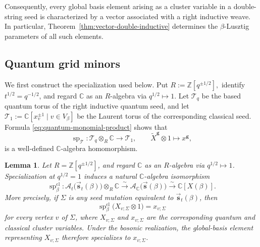 \documentclass[12pt, reqno]{amsart}
\theoremstyle{plain}
\newtheorem{lemma}[theorem]{Lemma}
\theoremstyle{definition}
\numberwithin{equation}{section}
\newcommand{\ZZ}{\mathbb{Z}}
\newcommand{\CC}{\mathbb{C}}
\begin{document}
Consequently, every global basis element arising as a cluster
variable in a double-string seed is characterized by a vector
associated with a right inductive weave. In particular,
Theorem~\ref{thm:vector-double-inductive} determines the
\(\beta\)-Lusztig parameters of all such elements.
\subsection{Quantum grid minors}
We first construct the specialization used below. Put
\(
    R:=\ZZ[q^{\pm1/2}],
\)
identify \(t^{1/2}=q^{-1/2}\), and regard \(\CC\) as an
\(R\)-algebra via \(q^{1/2}\mapsto1\). Let
\(\mathcal T_q\) be the based quantum torus of the right inductive
quantum seed, and let
\(
    \mathcal T_1
    :=
    \CC[x_v^{\pm1}\mid v\in V_\beta]
\)
be the Laurent torus of the corresponding classical seed. Formula
\eqref{eq:quantum-monomial-product} shows that
\begin{equation}\label{eq:initial-torus-specialization}
    \operatorname{sp}_{\mathcal T}\colon
    \mathcal T_q\otimes_R\CC
    \longrightarrow
    \mathcal T_1,
    \qquad
    \widetilde X^{\mathbf g}\otimes1
    \longmapsto
    x^{\mathbf g},
\end{equation}
is a well-defined \(\CC\)-algebra homomorphism.

\begin{lemma}
\label{lem:specialization-cluster-variables}
Let \(R=\ZZ[q^{\pm1/2}]\), and regard \(\CC\) as an \(R\)-algebra
via \(q^{1/2}\mapsto1\). Specialization at \(q^{1/2}=1\) induces a
natural \(\CC\)-algebra isomorphism
\begin{equation}\label{eq:cluster-specialization-map}
    \operatorname{sp}^{\mathrm{cl}}_\beta\colon
    \mathcal A_t\bigl(
        \overrightarrow{\mathbf s}_t(\beta)
    \bigr)\otimes_R\CC
    \xrightarrow{\sim}
    \mathcal A_{\CC}\bigl(
        \overrightarrow{\mathbf s}(\beta)
    \bigr)
    \xrightarrow{\sim}
    \CC[X(\beta)].
\end{equation}
More precisely, if \(\Sigma\) is any seed mutation equivalent to
\(\overrightarrow{\mathbf s}_t(\beta)\), then
\begin{equation}\label{eq:specialization-arbitrary-cluster-variable}
    \operatorname{sp}^{\mathrm{cl}}_\beta
    \bigl(X_{v;\Sigma}\otimes1\bigr)
    =
    x_{v;\Sigma}
\end{equation}
for every vertex \(v\) of \(\Sigma\), where \(X_{v;\Sigma}\) and
\(x_{v;\Sigma}\) are the corresponding quantum and classical cluster
variables. Under the bosonic realization, the global-basis element
representing \(X_{v;\Sigma}\) therefore specializes to
\(x_{v;\Sigma}\).
\end{lemma}
\end{document}
